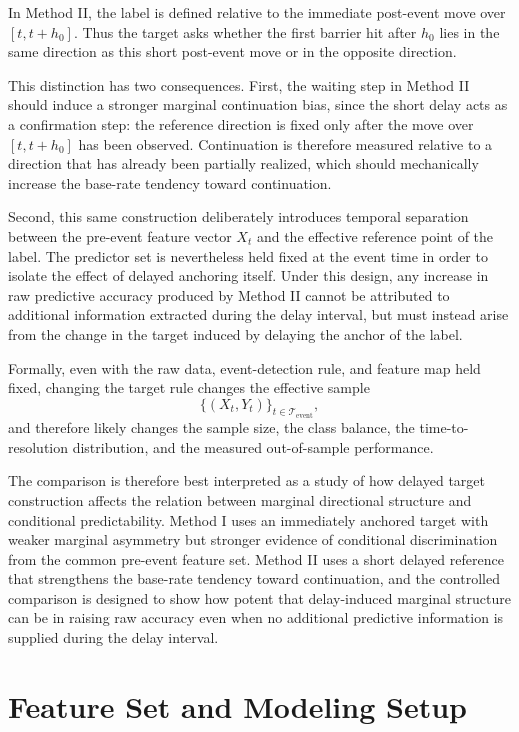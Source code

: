 \documentclass[11pt,a4paper]{article}
\begin{document}
	In Method II, the label is defined relative to the immediate post-event move over \([t,t+h_0]\). Thus the target asks whether the first barrier hit after \(h_0\) lies in the same direction as this short post-event move or in the opposite direction.

	This distinction has two consequences. First, the waiting step in Method II should induce a stronger marginal continuation bias, since the short delay acts as a confirmation step: the reference direction is fixed only after the move over \([t,t+h_0]\) has been observed. Continuation is therefore measured relative to a direction that has already been partially realized, which should mechanically increase the base-rate tendency toward continuation.

	Second, this same construction deliberately introduces temporal separation between the pre-event feature vector \(X_t\) and the effective reference point of the label. The predictor set is nevertheless held fixed at the event time in order to isolate the effect of delayed anchoring itself. Under this design, any increase in raw predictive accuracy produced by Method II cannot be attributed to additional information extracted during the delay interval, but must instead arise from the change in the target induced by delaying the anchor of the label.

	Formally, even with the raw data, event-detection rule, and feature map held fixed, changing the target rule changes the effective sample
	\[
	\{(X_t,Y_t)\}_{t \in \mathcal{T}_{\mathrm{event}}},
	\]
	and therefore likely changes the sample size, the class balance, the time-to-resolution distribution, and the measured out-of-sample performance.

	The comparison is therefore best interpreted as a study of how delayed target construction affects the relation between marginal directional structure and conditional predictability. Method I uses an immediately anchored target with weaker marginal asymmetry but stronger evidence of conditional discrimination from the common pre-event feature set. Method II uses a short delayed reference that strengthens the base-rate tendency toward continuation, and the controlled comparison is designed to show how potent that delay-induced marginal structure can be in raising raw accuracy even when no additional predictive information is supplied during the delay interval.

	
	\section{Feature Set and Modeling Setup}
\end{document}
